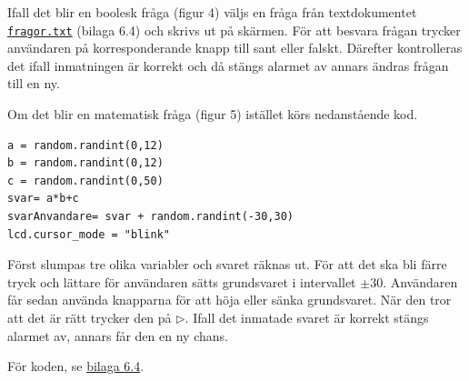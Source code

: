 


Ifall det blir en boolesk fråga (figur 4) väljs en fråga från textdokumentet \hyperref[sec:fragor]{\texttt{fragor.txt}} (bilaga 6.4) och skrivs ut på skärmen. För att besvara frågan trycker användaren på korresponderande knapp till sant eller falskt. Därefter kontrolleras det ifall inmatningen är korrekt och då stängs alarmet av annars ändras frågan till en ny. 

Om det blir en matematisk fråga (figur 5) istället körs nedanstående kod.
\begin{verbatim}
a = random.randint(0,12)
b = random.randint(0,12)
c = random.randint(0,50)
svar= a*b+c
svarAnvandare= svar + random.randint(-30,30)
lcd.cursor_mode = "blink"
\end{verbatim}
Först slumpas tre olika variabler och svaret räknas ut. För att det ska bli färre tryck och lättare för användaren sätts grundsvaret i intervallet $\pm 30$. Användaren får sedan använda knapparna för att höja eller sänka grundsvaret. När den tror att det är rätt trycker den på $\triangleright$. Ifall det inmatade svaret är korrekt stängs alarmet av, annars får den en ny chans.



För koden, se \hyperref[sec:kod]{bilaga 6.4}. 


